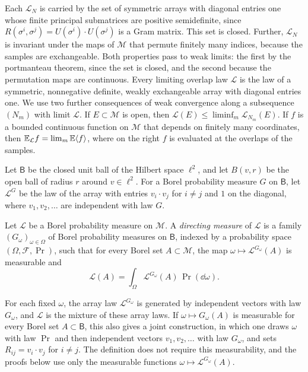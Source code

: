Each $\mathcal L_N$ is carried by the set of symmetric arrays with diagonal entries one whose finite principal submatrices are positive semidefinite, since $R(\sigma^i,\sigma^j)=U(\sigma^i)\cdot U(\sigma^j)$ is a Gram matrix. This set is closed. Further, $\mathcal L_N$ is invariant under the maps of $\mathcal M$ that permute finitely many indices, because the samples are exchangeable. Both properties pass to weak limits: the first by the portmanteau theorem, since the set is closed, and the second because the permutation maps are continuous. Every limiting overlap law $\mathcal L$ is the law of a symmetric, nonnegative definite, weakly exchangeable array with diagonal entries one. We use two further consequences of weak convergence along a subsequence $(N_m)$ with limit $\mathcal L$. If $E\subset\mathcal M$ is open, then $\mathcal L(E)\le\liminf_m\mathcal L_{N_m}(E)$. If $f$ is a bounded continuous function on $\mathcal M$ that depends on finitely many coordinates, then $\mathbb E_{\mathcal L}f=\lim_m\mathbb E\langle f\rangle$, where on the right $f$ is evaluated at the overlaps of the samples.

Let $\mathsf B$ be the closed unit ball of the Hilbert space $\ell^2$, and let $B(v,r)$ be the open ball of radius $r$ around $v\in\ell^2$. For a Borel probability measure $G$ on $\mathsf B$, let $\mathcal L^G$ be the law of the array with entries $v_i\cdot v_j$ for $i\ne j$ and $1$ on the diagonal, where $v_1,v_2,\dots$ are independent with law $G$.

\begin{definition}\label{def:dir-directing}
Let $\mathcal L$ be a Borel probability measure on $\mathcal M$. A \emph{directing measure} of $\mathcal L$ is a family $(G_\omega)_{\omega\in\Omega}$ of Borel probability measures on $\mathsf B$, indexed by a probability space $(\Omega,\mathcal F,\Pr)$, such that for every Borel set $A\subset\mathcal M$, the map $\omega\mapsto\mathcal L^{G_\omega}(A)$ is measurable and
\[
\mathcal L(A)=\int_\Omega\mathcal L^{G_\omega}(A)\,\Pr(\dd\omega).
\]
\end{definition}

For each fixed $\omega$, the array law $\mathcal L^{G_\omega}$ is generated by independent vectors with law $G_\omega$, and $\mathcal L$ is the mixture of these array laws. If $\omega\mapsto G_\omega(A)$ is measurable for every Borel set $A\subset\mathsf B$, this also gives a joint construction, in which one draws $\omega$ with law $\Pr$ and then independent vectors $v_1,v_2,\dots$ with law $G_\omega$, and sets $R_{ij}=v_i\cdot v_j$ for $i\ne j$. The definition does not require this measurability, and the proofs below use only the measurable functions $\omega\mapsto\mathcal L^{G_\omega}(A)$.

